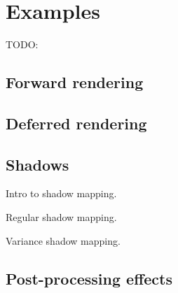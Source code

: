 
\chapter{ Examples }
\label{Chapter6}

TODO: 

\section{Forward rendering}
\section{Deferred rendering}
\section{Shadows}

Intro to shadow mapping.

Regular shadow mapping.

Variance shadow mapping.

\section{Post-processing effects}
